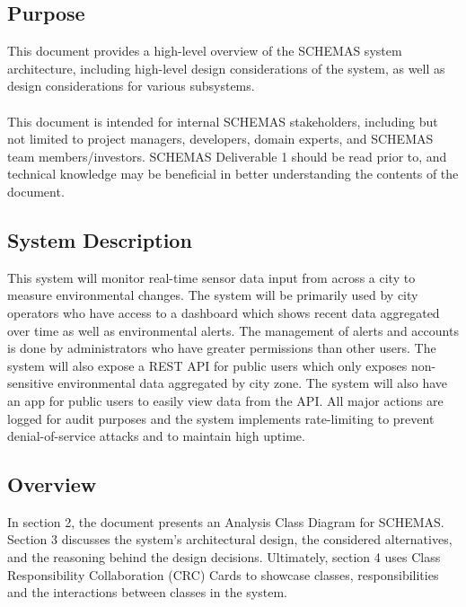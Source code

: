 \documentclass[]{article}
\begin{document}
\subsection{Purpose}
\label{sub:purpose}
This document provides a high-level overview of the SCHEMAS system architecture, including 
high-level design considerations of the system, as well as design considerations for various 
subsystems.\\\\
This document is intended for internal SCHEMAS stakeholders, including but not limited 
to project managers, developers, domain experts, and SCHEMAS team members/investors. 
SCHEMAS Deliverable 1 should be read prior to, and technical knowledge may be beneficial 
in better understanding the contents of the document.

\subsection{System Description}
\label{sub:system_description}
This system will monitor real-time sensor data input from across a city to measure environmental changes. The system will be primarily used by city operators who have access to a dashboard which shows recent data aggregated over time as well as environmental alerts. The management of alerts and accounts is done by administrators who have greater permissions than other users. The system will also expose a REST API for public users which only exposes non-sensitive environmental data aggregated by city zone. The system will also have an app for public users to easily view data from the API. All major actions are logged for audit purposes and the system implements rate-limiting to prevent denial-of-service attacks and to maintain high uptime. 

\subsection{Overview}
\label{sub:overview}
In section 2, the document presents an Analysis Class Diagram for SCHEMAS. Section 3 discusses the system's architectural design, the considered alternatives, and the reasoning behind the design decisions. Ultimately, section 4 uses Class Responsibility Collaboration (CRC) Cards to showcase classes, responsibilities and the interactions between classes in the system.

\end{document}
